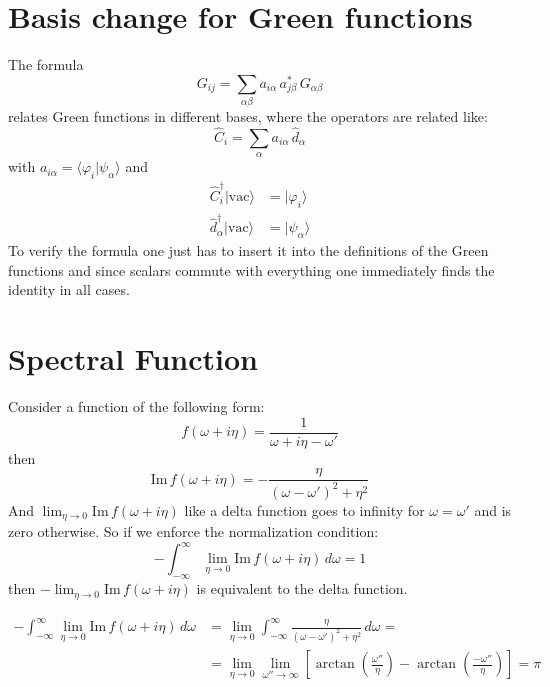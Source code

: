 \section{Basis change for Green functions}

The formula
\begin{equation}
    G_{ij} = \sum_{\alpha\beta} a_{i\alpha}\, a_{j\beta}^{*}\, G_{\alpha\beta} \label{eq:green-function-basis-change}
\end{equation}
relates Green functions in different bases, where the operators are related like:
\begin{equation*}
    \hat{C}_i = \sum_{\alpha} a_{i\alpha}\, \hat{d}_{\alpha}
\end{equation*}
with $a_{i\alpha} = \langle \varphi_i | \psi_\alpha \rangle$ and
\begin{align*}
    \hat{C}_i^{\dagger} |\text{vac}\rangle &= |\varphi_i\rangle \\
    \hat{d}_{\alpha}^{\dagger} |\text{vac}\rangle &= |\psi_\alpha\rangle
\end{align*}
To verify the formula one just has to insert it into the definitions of the Green functions and since scalars commute with everything one immediately finds the identity in all cases.

\section{Spectral Function}

Consider a function of the following form:
\begin{equation*}
    f(\omega+i\eta) = \frac{1}{\omega + i\eta - \omega'}
\end{equation*}
then
\begin{equation*}
    \mathrm{Im}\, f(\omega+i\eta) = -\frac{\eta}{(\omega - \omega')^2 + \eta^2}
\end{equation*}
And $\lim_{\eta \to 0} \mathrm{Im}\, f(\omega+i\eta)$ like a delta function goes to infinity for $\omega = \omega'$ and is zero otherwise.
So if we enforce the normalization condition:
\begin{equation*}
    - \int_{-\infty}^{\infty} \lim_{\eta \to 0} \mathrm{Im}\, f(\omega+i\eta)\, d\omega = 1
\end{equation*}
then $-\lim_{\eta \to 0} \mathrm{Im}\, f(\omega+i\eta)$ is equivalent to the delta function.

\begin{align*}
    - \int_{-\infty}^{\infty} \lim_{\eta \to 0} \mathrm{Im}\, f(\omega + i\eta)\, d\omega &= \lim_{\eta \to 0} \int_{-\infty}^{\infty} \frac{\eta}{(\omega - \omega')^2 + \eta^2}\, d\omega = \\
    &= \lim_{\eta \to 0} \lim_{\omega'' \to \infty} \left[ \arctan\left(\frac{\omega''}{\eta}\right) - \arctan\left(\frac{-\omega''}{\eta}\right) \right] = \pi
\end{align*}

